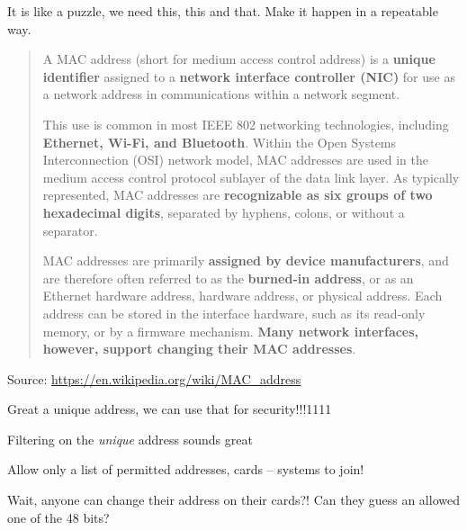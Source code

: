 \documentclass[Screen16to9,17pt]{foils}
\begin{document}
It is like a puzzle, we need this, this and that. Make it happen in a repeatable way.




\begin{quote}
A MAC address (short for medium access control address) is a {\bf unique identifier} assigned to a {\bf network interface controller (NIC)} for use as a network address in communications within a network segment.

This use is common in most IEEE 802 networking technologies, including {\bf Ethernet, Wi-Fi, and Bluetooth}. Within the Open Systems Interconnection (OSI) network model, MAC addresses are used in the medium access control protocol sublayer of the data link layer. As typically represented, MAC addresses are {\bf recognizable as six groups of two hexadecimal digits}, separated by hyphens, colons, or without a separator.

MAC addresses are primarily {\bf assigned by device manufacturers}, and are therefore often referred to as the {\bf burned-in address}, or as an Ethernet hardware address, hardware address, or physical address. Each address can be stored in the interface hardware, such as its read-only memory, or by a firmware mechanism. {\bf Many network interfaces, however, support changing their MAC addresses}.
\end{quote}
Source: \url{https://en.wikipedia.org/wiki/MAC_address}

\begin{list2}
\item Great a unique address, we can use that for security!!!1111
\end{list2}



\begin{list2}
\item  Filtering on the \emph{unique} address sounds great
\item Allow only a list of permitted addresses, cards -- systems to join!
\vskip 5mm
\item Wait, anyone can change their address on their cards?! Can they guess an allowed one of the 48 bits?
\end{list2}


\end{document}
